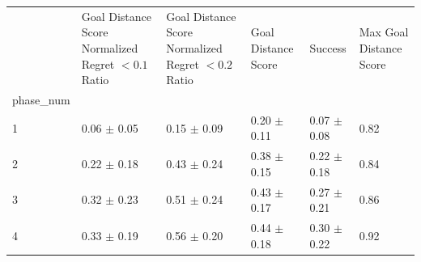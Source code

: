 \begin{tabular}{llllll}
\toprule
 & Goal Distance Score Normalized Regret $< 0.1$ Ratio & Goal Distance Score Normalized Regret $< 0.2$ Ratio & Goal Distance Score & Success & Max Goal Distance Score \\
phase_num &  &  &  &  &  \\
\midrule
1 & 0.06 $\pm$ 0.05 & 0.15 $\pm$ 0.09 & 0.20 $\pm$ 0.11 & 0.07 $\pm$ 0.08 & 0.82 \\
2 & 0.22 $\pm$ 0.18 & 0.43 $\pm$ 0.24 & 0.38 $\pm$ 0.15 & 0.22 $\pm$ 0.18 & 0.84 \\
3 & 0.32 $\pm$ 0.23 & 0.51 $\pm$ 0.24 & 0.43 $\pm$ 0.17 & 0.27 $\pm$ 0.21 & 0.86 \\
4 & 0.33 $\pm$ 0.19 & 0.56 $\pm$ 0.20 & 0.44 $\pm$ 0.18 & 0.30 $\pm$ 0.22 & 0.92 \\
\bottomrule
\end{tabular}
